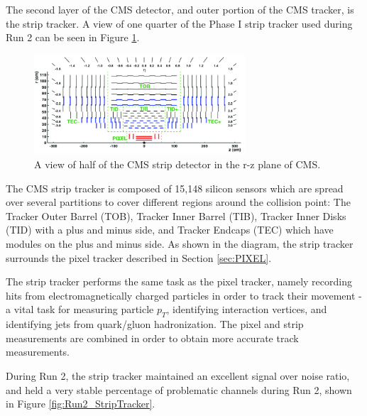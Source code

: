 
The second layer of the CMS detector, and outer portion of the CMS tracker, is the strip tracker. A view of one quarter of the Phase I strip tracker used during Run 2 can be seen in Figure \ref{fig:Strip_Tracker}. 

\begin{figure}[H]
    \centering
    \includegraphics[width=0.7\textwidth]{Images/CMS/Tracker/upper-Schematic-view-of-the-CMS-tracker-detector-1-and-lower-closeup-view-of-the.png}    
    \caption{A view of half of the CMS strip detector in the r-z plane of CMS.}
    \label{fig:Strip_Tracker}
\end{figure}

The CMS strip tracker is composed of 15,148 silicon sensors which are spread over several partitions to cover different regions around the collision point: The Tracker Outer Barrel (TOB), Tracker Inner Barrel (TIB), Tracker Inner Disks (TID) with a plus and minus side, and Tracker Endcaps (TEC) which have modules on the plus and minus side. As shown in the diagram, the strip tracker surrounds the pixel tracker described in Section \ref{sec:PIXEL}. 

The strip tracker performs the same task as the pixel tracker, namely recording hits from electromagnetically charged particles in order to track their movement - a vital task for measuring particle $p_{T}$, identifying interaction vertices, and identifying jets from quark/gluon hadronization. The pixel and strip measurements are combined in order to obtain more accurate track measurements.  

During Run 2, the strip tracker maintained an excellent signal over noise ratio, and held a very stable percentage of problematic channels during Run 2, shown in Figure \ref{fig:Run2_StripTracker}.

